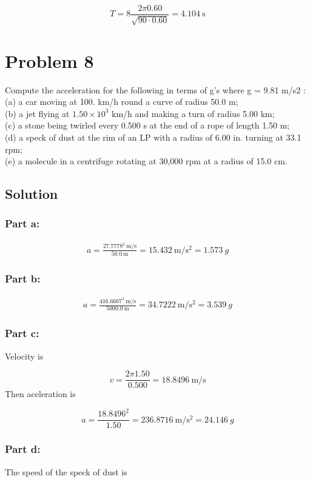\documentclass{article}
\begin{document}
\[
	T = 8 \frac{2 \pi 0.60}{\sqrt{90 \cdot 0.60}} = \boxed{4.104\ \text{s}}
\]


\section*{Problem 8}
Compute the acceleration for the following in terms of g's where g = 9.81 m/s2 :\\ (a) a car
moving at 100. km/h round a curve of radius 50.0 m;\\ (b) a jet flying at $1.50\times10^3$ km/h and
making a turn of radius 5.00 km;\\ (c) a stone being twirled every 0.500 s at the end of a rope of
length 1.50 m;\\ (d) a speck of dust at the rim of an LP with a radius of 6.00 in. turning at 33.1
rpm;\\ (e) a molecule in a centrifuge rotating at 30,000 rpm at a radius of 15.0 cm.

\subsection*{Solution}
\subsubsection*{Part a:}
\begin{align*}
	a = \frac{27.7778^2\ \text{m/s}}{50.0\ \text{m}} =  15.432\ \text{m}/\text{s}^2 = \boxed{1.573\ g}
\end{align*}

\subsubsection*{Part b:}
\begin{align*}
	a = \frac{416.6667^2\ \text{m/s}}{5000.0\ \text{m}} =  34.7222\ \text{m}/\text{s}^2 = \boxed{3.539\ g}
\end{align*}

\subsubsection*{Part c:}
Velocity is

\[
	v = \frac{2 \pi 1.50}{0.500} = 18.8496\ \text{m}/\text{s}
\]
Then aceleration is

\[
	a = \frac{18.8496^2}{1.50} = 236.8716\ \text{m}/\text{s}^2 = \boxed{24.146\ g}
\]

\subsubsection*{Part d:}
The speed of the speck of dust is
\end{document}

